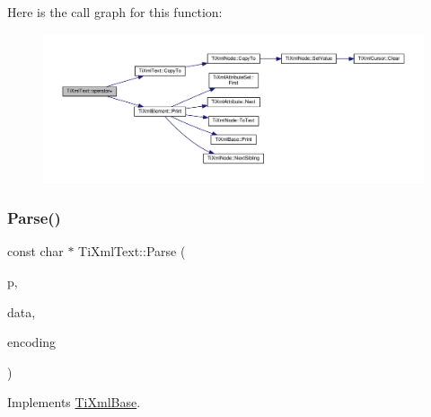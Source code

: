 Here is the call graph for this function\+:\nopagebreak
\begin{figure}[H]
\begin{center}
\leavevmode
\includegraphics[width=350pt]{class_ti_xml_text_aed5b13f9c1b804c616fd533882c29f57_cgraph}
\end{center}
\end{figure}
\mbox{\label{class_ti_xml_text_a8d2dcfa41fc73d3e62dacc2fcf633819}} 
\subsubsection{\texorpdfstring{Parse()}{Parse()}}
{\footnotesize\ttfamily const char $\ast$ Ti\+Xml\+Text\+::\+Parse (\begin{DoxyParamCaption}\item[{const char $\ast$}]{p,  }\item[{\hyperlink{class_ti_xml_parsing_data}{Ti\+Xml\+Parsing\+Data} $\ast$}]{data,  }\item[{\hyperlink{tinyxml_8h_a88d51847a13ee0f4b4d320d03d2c4d96}{Ti\+Xml\+Encoding}}]{encoding }\end{DoxyParamCaption})\hspace{0.3cm}{\ttfamily [virtual]}}



Implements \hyperlink{class_ti_xml_base_a00e4edb0219d00a1379c856e5a1d2025}{Ti\+Xml\+Base}.

